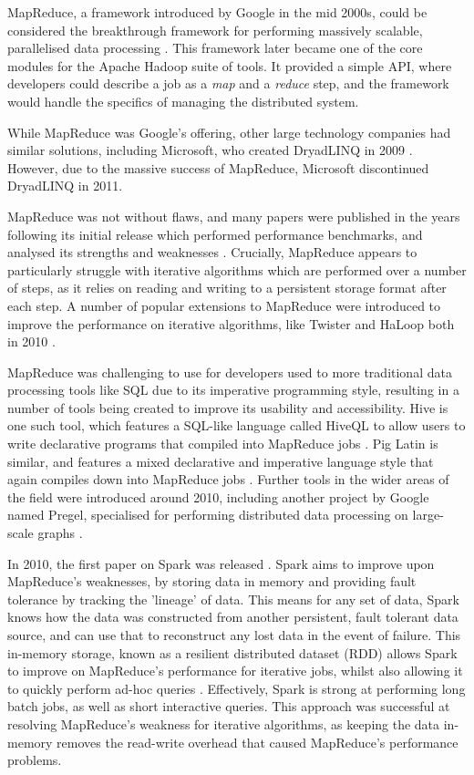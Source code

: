 MapReduce, a framework introduced by Google in the mid 2000s, could be considered the breakthrough framework for performing massively scalable, parallelised data processing \cite{dean2008mapreduce}. This framework later became one of the core modules for the Apache Hadoop suite of tools. It provided a simple API, where developers could describe a job as a \textit{map} and a \textit{reduce} step, and the framework would handle the specifics of managing the distributed system. 

While MapReduce was Google's offering, other large technology companies had similar solutions, including Microsoft, who created DryadLINQ in 2009 \cite{fetterly2009dryadlinq}. However, due to the massive success of MapReduce, Microsoft discontinued DryadLINQ in 2011.

MapReduce was not without flaws, and many papers were published in the years following its initial release which performed performance benchmarks, and analysed its strengths and weaknesses \cite{lee2012parallel}. Crucially, MapReduce appears to particularly struggle with iterative algorithms which are performed over a number of steps, as it relies on reading and writing to a persistent storage format after each step. A number of popular extensions to MapReduce were introduced to improve the performance on iterative algorithms, like Twister and HaLoop both in 2010 \cite{ekanayake2010twister, bu2010haloop}.

MapReduce was challenging to use for developers used to more traditional data processing tools like SQL due to its imperative programming style, resulting in a number of tools being created to improve its usability and accessibility. Hive is one such tool, which features a SQL-like language called HiveQL to allow users to write declarative programs that compiled into MapReduce jobs \cite{thusoo2010hive}. Pig Latin is similar, and features a mixed declarative and imperative language style that again compiles down into MapReduce jobs \cite{olston2008pig}. Further tools in the wider areas of the field were introduced around 2010, including another project by Google named Pregel, specialised for performing distributed data processing on large-scale graphs \cite{malewicz2010pregel}.

In 2010, the first paper on Spark was released \cite{zaharia2010spark}. Spark aims to improve upon MapReduce's weaknesses, by storing data in memory and providing fault tolerance by tracking the 'lineage' of data. This means for any set of data, Spark knows how the data was constructed from another persistent, fault tolerant data source, and can use that to reconstruct any lost data in the event of failure. This in-memory storage, known as a resilient distributed dataset (RDD) allows Spark to improve on MapReduce's performance for iterative jobs, whilst also allowing it to quickly perform ad-hoc queries \cite{zaharia2012rdd}. Effectively, Spark is strong at performing long batch jobs, as well as short interactive queries. This approach was successful at resolving MapReduce's weakness for iterative algorithms, as keeping the data in-memory removes the read-write overhead that caused MapReduce's performance problems. 

